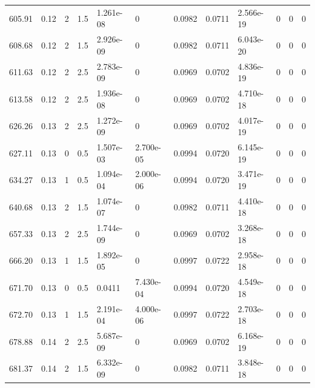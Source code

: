 \documentclass[preview]{standalone}
\begin{document}
{{{\begin{tabular}{L{1.2cm}C{1.2cm} C{0.3cm}C{0.5cm} C{1.4cm}C{1.4cm} C{1.4cm}C{1.4cm} C{1.6cm}C{1.6cm} C{1.6cm}C{1.6cm}}
  605.91  &  0.12  & 2     & 1.5 &  1.261e-08  & 0  &  0.0982&   0.0711& 2.566e-19 & 0   &  0 & 0  \\ 
  608.68  &  0.12  & 2     & 1.5 &  2.926e-09  & 0  &  0.0982&   0.0711& 6.043e-20 & 0   &  0 & 0  \\ 
  611.63  &  0.12  & 2     & 2.5 &  2.783e-09  & 0  &  0.0969&   0.0702& 4.836e-19 & 0   &  0 & 0  \\ 
  613.58  &  0.12  & 2     & 2.5 &  1.936e-08  & 0  &  0.0969&   0.0702& 4.710e-18 & 0   &  0 & 0  \\ 
  626.26  &  0.13  & 2     & 2.5 &  1.272e-09  & 0  &  0.0969&   0.0702& 4.017e-19 & 0   &  0 & 0  \\ 
  627.11  &  0.13  & 0     & 0.5 &  1.507e-03  & 2.700e-05  &  0.0994&   0.0720& 6.145e-19 & 0   &  0 & 0  \\ 
  634.27  &  0.13  & 1     & 0.5 &  1.094e-04  & 2.000e-06  &  0.0994&   0.0720& 3.471e-19 & 0   &  0 & 0  \\ 
  640.68  &  0.13  & 2     & 1.5 &  1.074e-07  & 0  &  0.0982&   0.0711& 4.410e-18 & 0   &  0 & 0  \\ 
  657.33  &  0.13  & 2     & 2.5 &  1.744e-09  & 0  &  0.0969&   0.0702& 3.268e-18 & 0   &  0 & 0  \\ 
  666.20  &  0.13  & 1     & 1.5 &  1.892e-05  & 0  &  0.0997&   0.0722& 2.958e-18 & 0   &  0 & 0  \\ 
  671.70  &  0.13  & 0     & 0.5 &  0.0411  & 7.430e-04  &  0.0994&   0.0720& 4.549e-18 & 0   &  0 & 0  \\ 
  672.70  &  0.13  & 1     & 1.5 &  2.191e-04  & 4.000e-06  &  0.0997&   0.0722& 2.703e-18 & 0   &  0 & 0  \\ 
  678.88  &  0.14  & 2     & 2.5 &  5.687e-09  & 0  &  0.0969&   0.0702& 6.168e-19 & 0   &  0 & 0  \\ 
  681.37  &  0.14  & 2     & 1.5 &  6.332e-09  & 0  &  0.0982&   0.0711& 3.848e-18 & 0   &  0 & 0  \\ 
\hline 
\end{tabular} 

}}}
\end{document}
